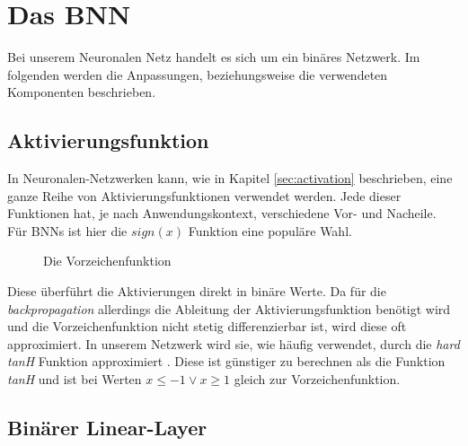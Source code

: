 \chapter{Das BNN}
Bei unserem Neuronalen Netz handelt es sich um ein binäres Netzwerk. Im folgenden werden die Anpassungen, beziehungsweise die verwendeten Komponenten beschrieben.
\section{Aktivierungsfunktion}
In Neuronalen-Netzwerken kann, wie in Kapitel \ref{sec:activation} beschrieben, eine ganze Reihe von Aktivierungsfunktionen verwendet werden. Jede dieser Funktionen hat, je nach Anwendungskontext, verschiedene Vor- und Nacheile.\\
Für BNNs ist hier die $sign(x)$ Funktion eine populäre Wahl.
\begin{figure}[h]
	\centering
	\caption{Die Vorzeichenfunktion}
	\label{fig:sign}
\end{figure} 
Diese überführt die Aktivierungen direkt in binäre Werte. Da für die \textit{backpropagation} allerdings die Ableitung der Aktivierungsfunktion benötigt wird und die Vorzeichenfunktion nicht stetig differenzierbar ist, wird diese oft approximiert. In unserem Netzwerk wird sie, wie häufig verwendet, durch die \textit{hard tanH} Funktion approximiert \cite{DBLP:journals/corr/abs-2012-00938}. Diese ist günstiger zu berechnen als die Funktion \textit{tanH} und ist bei Werten $x\leq-1 \vee x \geq 1$ gleich zur Vorzeichenfunktion.
\section{Binärer Linear-Layer}
